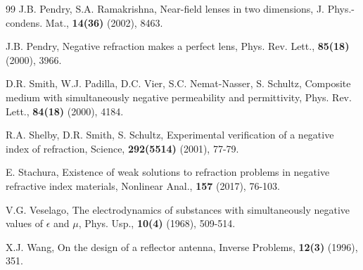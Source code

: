 \documentclass[a4paper,12pt,]{article}
\numberwithin{equation}{section}
\numberwithin{equation}{section} \allowdisplaybreaks
\begin{document}
\begin{thebibliography}{99}
 J.B. Pendry, S.A. Ramakrishna, Near-field lenses in two dimensions, J. Phys.-condens. Mat., \textbf{14(36)} (2002), 8463.

 J.B. Pendry, Negative refraction makes a perfect lens, Phys. Rev. Lett., \textbf{85(18)} (2000), 3966.

 D.R. Smith, W.J. Padilla, D.C. Vier, S.C. Nemat-Nasser, S. Schultz, Composite medium with simultaneously negative permeability and permittivity, Phys. Rev. Lett., \textbf{84(18)} (2000), 4184.

 R.A. Shelby, D.R. Smith, S. Schultz, Experimental verification of a negative index of refraction, Science, \textbf{292(5514)} (2001), 77-79.

 E. Stachura, Existence of weak solutions to refraction problems in negative refractive index materials, Nonlinear Anal., \textbf{157} (2017), 76-103.

 V.G. Veselago, The electrodynamics of substances with simultaneously negative values of $\epsilon$ and $\mu$, Phys. Usp., \textbf{10(4)} (1968), 509-514.

 X.J. Wang, On the design of a reflector antenna, Inverse Problems, \textbf{12(3)} (1996), 351.
		
		
\end{thebibliography}
	
	
	
	
\end{document}
